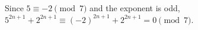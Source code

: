 Since $5\equiv-2\pmod7$ and the exponent is odd, $5^{2n+1}+2^{2n+1}\equiv(-2)^{2n+1}+2^{2n+1}=0\pmod7$.
